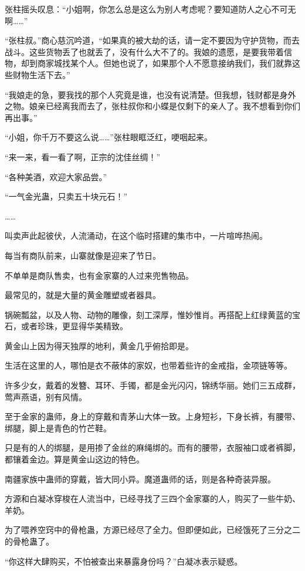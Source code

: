 \begin{this_body}
张柱摇头叹息：“小姐啊，你怎么总是这么为别人考虑呢？要知道防人之心不可无啊……”

“张柱叔。”商心慈沉吟道，“如果真的被大劫的话，请一定不要因为守护货物，而去战斗。这些货物丢了也就丢了，没有什么大不了的。我娘的遗愿，是要我带着信物，却到商家城找某个人。但她也说了，如果那个人不愿意接纳我们，我们就靠这些财物生活下去。”

“我娘走的急，要我找的那个人究竟是谁，也没有说清楚。但我想，钱财都是身外之物。娘亲已经离我而去了，张柱叔你和小蝶是仅剩下的亲人了。我不想看到你们再出事。”

“小姐，你千万不要这么说……”张柱眼眶泛红，哽咽起来。

“来一来，看一看了啊，正宗的沈佳丝绸！”

“各种美酒，欢迎大家品尝。”

“一气金光蛊，只卖五十块元石！”

……

叫卖声此起彼伏，人流涌动，在这个临时搭建的集市中，一片喧哗热闹。

每当有商队前来，山寨就像是迎来了节日。

不单单是商队售卖，也有金家寨的人过来兜售物品。

最常见的，就是大量的黄金雕塑或者器具。

锅碗瓢盆，以及人物、动物的雕像，刻工深厚，惟妙惟肖。再搭配上红绿黄蓝的宝石，或者珍珠，更显得华美精致。

黄金山上因为得天独厚的地利，黄金几乎俯拾即是。

生活在这里的人，哪怕是衣不蔽体的家奴，也带着些许的金戒指，金项链等等。

许多少女，戴着的发簪、耳环、手镯，都是金光闪闪，锦绣华丽。她们三五成群，莺声燕语，别有风情。

至于金家的蛊师，身上的穿戴和青茅山大体一致。上身短衫，下身长裤，有腰带、绑腿，脚上是青色的竹芒鞋。

只是有的人的绑腿，是用掺了金丝的麻绳绑的。而有的腰带，衣服袖口或者裤脚，都镶着金边。算是黄金山这边的特色。

南疆家族中蛊师的穿戴，皆大同小异。魔道蛊师的话，则是各种奇装异服。

方源和白凝冰穿梭在人流当中，已经寻找了三四个金家寨的人，购买了一些牛奶、羊奶。

为了喂养空窍中的骨枪蛊，方源已经尽了全力。但即便如此，已经饿死了三分之二的骨枪蛊了。

“你这样大肆购买，不怕被查出来暴露身份吗？”白凝冰表示疑惑。


\end{this_body}
